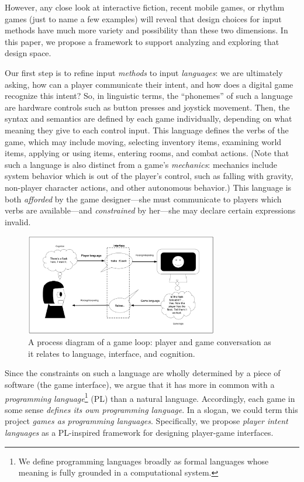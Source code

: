 \documentclass[sigconf]{acmart}
\begin{document}
However, any close look at interactive fiction, recent mobile games, or
rhythm games (just to name a few examples) will reveal that design choices
for input methods have much more variety and possibility than these two
dimensions. In this paper, we propose a framework to support analyzing and exploring
that design space. 

Our first step is to refine input {\em methods} to input {\em languages}:
we are ultimately asking, how can a player communicate their intent, and
how does a digital game recognize this intent?  So, in linguistic terms,
the ``phonemes'' of such a language are hardware controls such as button
presses and joystick movement. Then, the syntax and semantics are defined
by each game individually, depending on what meaning they give to each
control input. This language defines the verbs of the game, which may
include moving, selecting inventory items, examining world items, applying
or using items, entering rooms, and combat actions.  (Note that such a
language is also distinct from a game's {\em mechanics}: mechanics include
system behavior which is out of the player's control, such as falling with
gravity, non-player character actions, and other autonomous behavior.) This
language is both {\em afforded} by the game designer---she must communicate
to players which verbs are available---and {\em constrained} by her---she
may declare certain expressions invalid.

\begin{figure}
\includegraphics[width=0.75\textwidth]{conversation-processing.png}
\caption{A process diagram of a game loop: player and game conversation as
it relates to language, interface, and cognition.}
\label{fig:gameloop}
\end{figure}

Since the constraints on such a language are wholly determined
by a piece of software (the game interface), we argue that it
has more in common with a {\em programming language}\footnote{We define
  programming languages broadly as formal languages whose meaning is fully
grounded in a computational system.} (PL) than a natural language.
Accordingly, each game in some sense {\em defines its own programming
language}. In a slogan, we could term this project {\em games as
programming languages}.
%
Specifically, we propose \emph{player intent languages} as a PL-inspired
framework for designing player-game interfaces.
\end{document}
